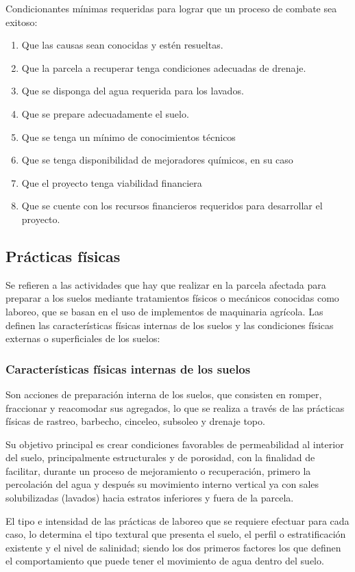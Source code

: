 Condicionantes mínimas requeridas para lograr que un proceso de combate sea exitoso:
\begin{enumerate}
    \item Que las causas sean conocidas y estén resueltas.
    \item Que la parcela a recuperar tenga condiciones adecuadas de drenaje.
    \item Que se disponga del agua requerida para los lavados.
    \item Que se prepare adecuadamente el suelo.
    \item Que se tenga un mínimo de conocimientos técnicos
    \item Que se tenga disponibilidad de mejoradores químicos, en su caso
    \item Que el proyecto tenga viabilidad financiera
    \item Que se cuente con los recursos financieros requeridos para desarrollar el proyecto.
\end{enumerate}

\subsection{Prácticas físicas} 
Se refieren a las actividades que hay que realizar en la parcela afectada para preparar a los suelos mediante tratamientos físicos o mecánicos conocidas como laboreo, que se basan en el uso de implementos de maquinaria agrícola. Las definen las características físicas internas de los suelos y las condiciones físicas externas o superficiales de los suelos:
\subsubsection{Características físicas internas de los suelos} 
Son acciones de preparación interna de los suelos, que consisten en romper, fraccionar y reacomodar sus agregados, lo que se realiza a través de las prácticas físicas de rastreo, barbecho, cinceleo, subsoleo y drenaje topo.

Su objetivo principal es crear condiciones favorables de permeabilidad al interior del suelo, principalmente estructurales y de porosidad, con la finalidad de facilitar, durante un proceso de mejoramiento o recuperación, primero la percolación del agua y después su movimiento interno vertical ya con sales solubilizadas (lavados) hacia estratos inferiores y fuera de la parcela.


El tipo e intensidad de las prácticas de laboreo que se requiere efectuar para cada caso, lo determina el tipo textural que presenta el suelo, el perfil o estratificación existente y el nivel de salinidad; siendo los dos primeros factores los que definen el comportamiento que puede tener el movimiento de agua dentro del suelo.

